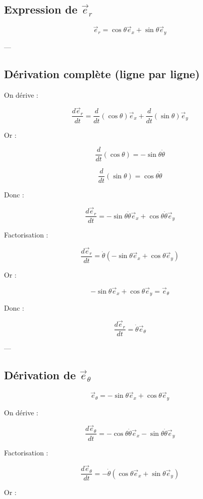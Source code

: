 \documentclass[11pt,a4paper]{article}
\begin{document}
\subsection{Expression de $\vec{e}_r$}

\[
\vec{e}_r = \cos\theta \vec{e}_x + \sin\theta \vec{e}_y
\]

---

\subsection{Dérivation complète (ligne par ligne)}

On dérive :

\[
\frac{d\vec{e}_r}{dt}
=
\frac{d}{dt}(\cos\theta)\vec{e}_x + \frac{d}{dt}(\sin\theta)\vec{e}_y
\]

Or :

\[
\frac{d}{dt}(\cos\theta) = -\sin\theta \dot{\theta}
\]

\[
\frac{d}{dt}(\sin\theta) = \cos\theta \dot{\theta}
\]

Donc :

\[
\frac{d\vec{e}_r}{dt}
=
-\sin\theta \dot{\theta} \vec{e}_x + \cos\theta \dot{\theta} \vec{e}_y
\]

Factorisation :

\[
\frac{d\vec{e}_r}{dt}
=
\dot{\theta}(-\sin\theta \vec{e}_x + \cos\theta \vec{e}_y)
\]

Or :

\[
-\sin\theta \vec{e}_x + \cos\theta \vec{e}_y = \vec{e}_\theta
\]

Donc :

\[
\boxed{
\frac{d\vec{e}_r}{dt} = \dot{\theta} \vec{e}_\theta
}
\]

---

\subsection{Dérivation de $\vec{e}_\theta$}

\[
\vec{e}_\theta = -\sin\theta \vec{e}_x + \cos\theta \vec{e}_y
\]

On dérive :

\[
\frac{d\vec{e}_\theta}{dt}
=
-\cos\theta \dot{\theta} \vec{e}_x - \sin\theta \dot{\theta} \vec{e}_y
\]

Factorisation :

\[
\frac{d\vec{e}_\theta}{dt}
=
-\dot{\theta}(\cos\theta \vec{e}_x + \sin\theta \vec{e}_y)
\]

Or :
\end{document}
